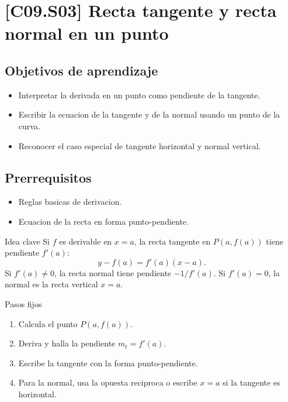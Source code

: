\section{[C09.S03] Recta tangente y recta normal en un punto}

\subsection*{Objetivos de aprendizaje}
\begin{itemize}
  \item Interpretar la derivada en un punto como pendiente de la tangente.
  \item Escribir la ecuacion de la tangente y de la normal usando un punto de la curva.
  \item Reconocer el caso especial de tangente horizontal y normal vertical.
\end{itemize}

\subsection*{Prerrequisitos}
\begin{itemize}
  \item Reglas basicas de derivacion.
  \item Ecuacion de la recta en forma punto-pendiente.
\end{itemize}

\begin{theorybox}{Idea clave}
Si \(f\) es derivable en \(x=a\), la recta tangente en \(P(a,f(a))\) tiene pendiente
\(f'(a)\):
\[
y-f(a)=f'(a)(x-a).
\]
Si \(f'(a)\neq 0\), la recta normal tiene pendiente \(-1/f'(a)\). Si \(f'(a)=0\), la normal
es la recta vertical \(x=a\).
\end{theorybox}

\begin{methodbox}{Pasos fijos}
\begin{enumerate}
  \item Calcula el punto \(P(a,f(a))\).
  \item Deriva y halla la pendiente \(m_t=f'(a)\).
  \item Escribe la tangente con la forma punto-pendiente.
  \item Para la normal, usa la opuesta reciproca o escribe \(x=a\) si la tangente es
  horizontal.
\end{enumerate}
\end{methodbox}

